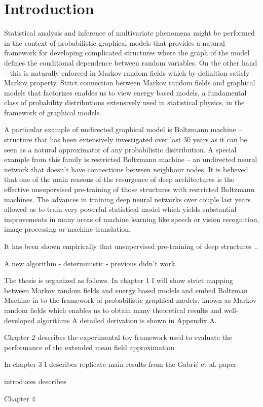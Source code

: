 \chapter{Introduction}
Statistical analysis and inference of multivariate phenomena might be performed in the context of probabilistic graphical models that provides a natural framework for developing complicated structures where the graph of the model defines the conditional dependence between random variables. On the other hand -- this is naturally enforced in Markov random fields which by definition satisfy Markov property. Strict connection between Markov random fields and graphical models that factorizes enables us to view energy based models, a fundamental class of probability distributions extensively used in statistical physics, in the framework of graphical models.

A particular example of undirected graphical model is Boltzmann machine -- structure that has been extensively investigated over last $30$ years as it can be seen as a natural approximator of any probabilistic disitribution. A special example from this family is restricted Boltzmann machine -- an undirected neural network that doesn't have connections between neighbour nodes. It is believed that one of the main reasons of the resurgence of deep architectures is the effective unsupervised pre-training of those structures with restricted Boltzmann machines. The advances in training deep neural networks over couple last years allowed us to train very powerful statistical model which yields substantial improvements in many areas of machine learning like speech or vision recognition, image processing or machine translation. 


It has been shown empirically that unsupervised pre-training of deep structures ..
\cite{erhan2010does}

A new algorithm - deterministic - previous didn't work.\cite{gabrie2015training}

The thesis is organized as follows. In chapter $1$ I will show strict mapping between Markov random fields and energy based models and embed Boltzman Machine in to the framework of probabilistic graphical models. known as Markov random fields which enables us to obtain many theoretical results and well-developed algorithms
A detailed derivation is shown in Appendix A.

Chapter $2$ describes the experimental toy framework used to evaluate the performance of the extended mean field approximation 

In chapter $3$ I describes  replicate main results from the Gabri\'e et al. paper 


introduces describes

Chapter 4
